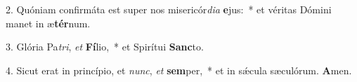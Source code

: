2. Quóniam confirmáta est super nos misericór\textit{di}\textit{a} \textbf{e}jus:~*  et véritas Dómini manet in æ\textbf{tér}num.\

3. Glória Pa\textit{tri}, \textit{et} \textbf{Fí}lio,~*  et Spirítui \textbf{Sanc}to.\

4. Sicut erat in princípio, et \textit{nunc}, \textit{et} \textbf{sem}per,~*  et in sǽcula sæculórum. \textbf{A}men.\

